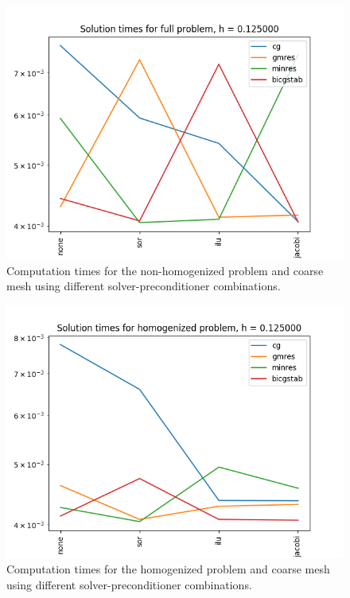 \documentclass{article}
\begin{document}
  \begin{figure}[h]
    \centering
    \includegraphics[width=0.8\linewidth]{solution_times_full_big_h.png}
    \caption{Computation times for the non-homogenized problem and coarse mesh using different solver-preconditioner combinations.}
    \label{fig:solution_times_full_big_h}
  \end{figure}
  \begin{figure}[h]
    \centering
    \includegraphics[width=0.8\linewidth]{solution_times_homogenized_big_h.png}
    \caption{Computation times for the homogenized problem and coarse mesh using different solver-preconditioner combinations.}
    \label{fig:solution_times_full_big_h}
  \end{figure}
\end{document}
